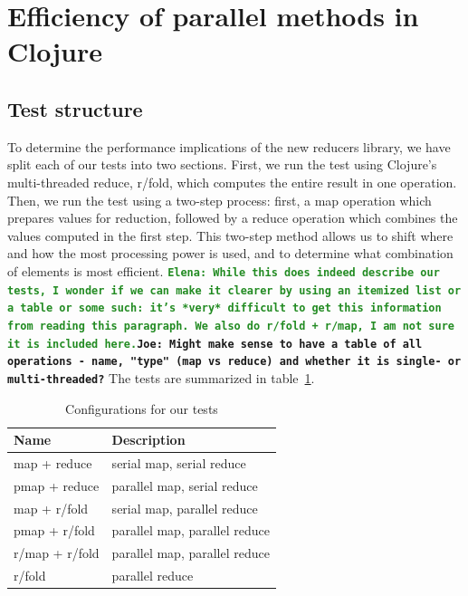 \documentclass[12pt]{article}
\newcommand{\comment}[1]{{\bf \tt  {#1}}}
\newcommand{\emcomment}[1]{\textcolor{ForestGreen}{\comment{Elena: {#1}}}}
\newcommand{\joecomment}[1]{\textcolor{JoesGold}{\comment{Joe: {#1}}}}
\begin{document}
\section{Efficiency of parallel methods in Clojure}\label{sec:efficiency} 

\subsection{Test structure}\label{sec:testStruct}
To determine the performance implications of the new reducers library, we have split each of our tests into two sections. First, we run the test using Clojure's multi-threaded reduce, r/fold, which computes the entire result in one operation. Then, we run the test using a two-step process: first, a map operation which prepares values for reduction, followed by a reduce operation which combines the values computed in the first step. This two-step method allows us to shift where and how the most processing power is used, and to determine what combination of elements is most efficient.
\emcomment{While this does indeed describe our tests, I wonder if we can make it clearer by using an itemized list or a table or some such: it's *very* difficult to get this information from reading this paragraph. We also do r/fold + r/map, I am not sure it is included here.}\joecomment{Might make sense to have a table of all operations - name, "type" (map vs reduce) and whether it is single- or multi-threaded?}
The tests are summarized in table~\ref{table:tests}.

\begin{table}
\begin{center}
\begin{tabular}{|l|l|}
\hline 
Name & Description \\
\hline
map + reduce & serial map, serial reduce \\
pmap + reduce & parallel map, serial reduce \\
map + r/fold & serial map, parallel reduce \\
pmap + r/fold & parallel map, parallel reduce\\
r/map + r/fold & parallel map, parallel reduce\\
r/fold & parallel reduce\\
\hline
\end{tabular}
\end{center}
\caption{Configurations for our tests}\label{table:tests}
\end{table}
\end{document}
